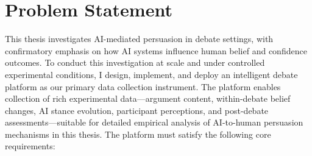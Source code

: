 \section{Problem Statement}

This thesis investigates AI-mediated persuasion in debate settings, with confirmatory emphasis on
how AI systems influence human belief and confidence outcomes. To conduct this investigation at scale
and under controlled experimental conditions, I design,
implement, and deploy an intelligent debate platform as our primary data collection instrument.
The platform enables collection of rich experimental data---argument content, within-debate belief
changes, AI stance evolution, participant perceptions, and post-debate assessments---suitable for
detailed empirical analysis of AI-to-human persuasion mechanisms in this thesis.
The platform must satisfy the following core requirements:

